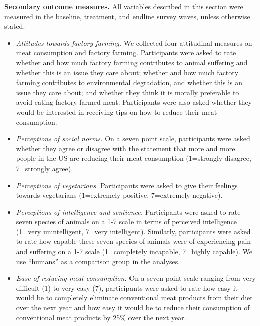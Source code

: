 \documentclass[12pt]{article}
\begin{document}
\textbf{Secondary outcome measures.} All variables described in this section were measured in the baseline, treatment, and endline survey waves, unless otherwise stated.

\begin{itemize}
    \item \textit{Attitudes towards factory farming.} We collected four attitudinal measures on meat consumption and factory farming. Participants were asked to rate whether and how much factory farming contributes to animal suffering and whether this is an issue they care about; whether and how much factory farming contributes to environmental degradation, and whether this is an issue they care about; and whether they think it is morally preferable to avoid eating factory farmed meat. Participants were also asked whether they would be interested in receiving tips on how to reduce their meat consumption.

    \item \textit{Perceptions of social norms.} On a seven point scale, participants were asked whether they agree or disagree with the statement that more and more people in the US are reducing their meat consumption (1=strongly disagree, 7=strongly agree).

    \item \textit{Perceptions of vegetarians.} Participants were asked to give their feelings towards vegetarians (1=extremely positive, 7=extremely negative). 

    \item \textit{Perceptions of intelligence and sentience.} Participants were asked to rate seven species of animals on a 1-7 scale in terms of perceived intelligence (1=very unintelligent, 7=very intelligent). Similarly, participants were asked to rate how capable these seven species of animals were of experiencing pain and suffering on a 1-7 scale (1=completely incapable, 7=highly capable). We use ``humans'' as a comparison group in the analyses.

    \item \textit{Ease of reducing meat consumption.} On a seven point scale ranging from very difficult (1) to very easy (7), participants were asked to rate how easy it would be to completely eliminate conventional meat products from their diet over the next year and how easy it would be to reduce their consumption of conventional meat products by 25\% over the next year.
\end{itemize}

\end{document}
